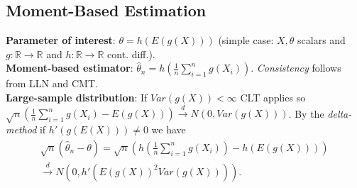 \subsection{Moment-Based Estimation}
\textbf{Parameter of interest}: $\theta = h(E(g(X)))$ (simple case: $X, \theta$ scalars and $g:\mathbb{R}\to\mathbb{R}$ and $h:\mathbb{R}\to\mathbb{R}$ cont. diff.).\\
\textbf{Moment-based estimator}: $\hat{\theta}_n = h\left(\frac{1}{n}\sum_{i=1}^ng(X_i)\right)$. \emph{Consistency} follows from LLN and CMT. \\
\textbf{Large-sample distribution}: If $Var(g(X))<\infty$ CLT applies so $\sqrt{n}\left(\frac{1}{n}\sum_{i=1}^ng(X_i) - E(g(X))\right)\xrightarrow{d}N(0, Var(g(X)))$. By the \emph{delta-method} if $h'(g(E(X)))\neq0$ we have 
\begin{equation*}
	\begin{split}
		\sqrt{n}(\hat{\theta}_n - \theta) = \sqrt{n}\left(h\left(\frac{1}{n}\sum_{i=1}^ng(X_i)\right) - h(E(g(X)))\right) \\
		\xrightarrow{d} N(0, h'(E(g(X))^2Var(g(X)))).
	\end{split}
\end{equation*}